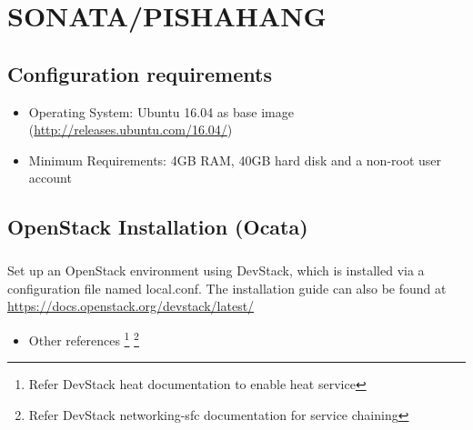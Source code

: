 \chapter{SONATA/PISHAHANG}
\label{ch:pishahang}

	\section{Configuration requirements}
	\label{sec:Configuration requirements to run Pishahang on a single server or VM}
	\begin{itemize}
		\item Operating System: Ubuntu 16.04 as base image (\hyperlink{name}{http://releases.ubuntu.com/16.04/})
		\item Minimum Requirements: 4GB RAM, 40GB hard disk and a non-root user account
	\end{itemize}
	
	
	\section{OpenStack Installation (Ocata)}
	\label{OpenStack Installation}
	\paragraph{}
	Set up an OpenStack environment using DevStack, which is installed via a configuration file named local.conf. The installation guide can also be found at\\ \hyperlink{name}{https://docs.openstack.org/devstack/latest/} 
	
	\begin{itemize}
		\item Other references 
		\footnote{Refer DevStack heat documentation to enable heat service}
		\footnote{Refer DevStack networking-sfc documentation for service chaining}
	\end{itemize}
	
